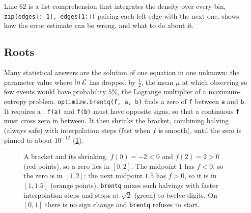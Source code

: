 Line 62 is a list comprehension that integrates the density over every bin, \texttt{zip(edges[:-1], edges[1:])} pairing each left edge with the next one.  shows how the error estimate can be wrong, and what to do about it.

\subsection{Roots}
\label{T0a:sec:roots}

Many statistical answers are the solution of one equation in one unknown: the parameter value where $\ln\mathcal{L}$ has dropped by $\tfrac12$, the mean $\mu$ at which observing so few events would have probability $5\%$, the Lagrange multiplier of a maximum-entropy problem. \texttt{optimize.brentq(f, a, b)} finds a zero of \texttt{f} between \texttt{a} and \texttt{b}. It requires a : \texttt{f(a)} and \texttt{f(b)} must have opposite signs, so that a continuous \texttt{f} must cross zero in between. It then shrinks the bracket, combining halving (always safe) with interpolation steps (fast when $f$ is smooth), until the zero is pinned to about $10^{-12}$ (\cref{T0a:fig:brentq}).

\begin{figure}[htbp]
\centering
{}
\caption{A bracket and its shrinking. $f(0)=-2<0$ and $f(2)=2>0$ (red points), so a zero lies in $[0,2]$. The midpoint $1$ has $f<0$, so the zero is in $[1,2]$; the next midpoint $1.5$ has $f>0$, so it is in $[1,1.5]$ (orange points). \texttt{brentq} mixes such halvings with faster interpolation steps and stops at $\sqrt2$ (green) to twelve digits. On $[0,1]$ there is no sign change and \texttt{brentq} refuses to start.}
\label{T0a:fig:brentq}
\end{figure}


